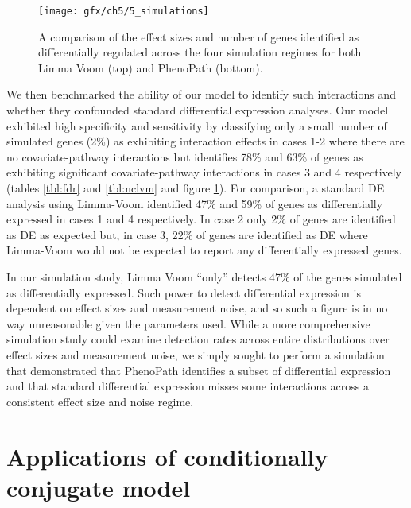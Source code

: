 \begin{figure}
\centering
  \texttt{[image: gfx/ch5/5\_simulations]}
  \caption{A comparison of the effect sizes and number of genes identified as differentially regulated across the four simulation regimes for both Limma Voom (top) and PhenoPath (bottom). } \label{fig:simulations}
\end{figure}



We then benchmarked the ability of our model to identify such interactions and whether they confounded standard differential expression analyses. Our model exhibited high specificity and sensitivity by classifying only a small number of simulated genes (2\%) as exhibiting interaction effects in cases 1-2 where there are no covariate-pathway interactions but identifies 78\% and 63\% of genes as exhibiting significant covariate-pathway interactions in cases 3 and 4 respectively (tables \ref{tbl:fdr} and \ref{tbl:nclvm} and figure \ref{fig:simulations}). For comparison, a standard DE analysis using Limma-Voom identified 47\% and 59\% of genes as differentially expressed in cases 1 and 4 respectively. In case 2 only 2\% of genes are identified as DE as expected but, in case 3, 22\% of genes are identified as DE where Limma-Voom would not be expected to report any differentially expressed genes.

In our simulation study, Limma Voom ``only'' detects 47\% of the genes simulated as differentially expressed. Such power to detect differential expression is dependent on effect sizes and measurement noise, and so such a figure is in no way unreasonable given the parameters used. While a more comprehensive simulation study could examine detection rates across entire distributions over effect sizes and measurement noise, we simply sought to perform a simulation that demonstrated that PhenoPath identifies a subset of differential expression and that standard differential expression misses some interactions across a consistent effect size and noise regime.




\section{Applications of conditionally conjugate model}

